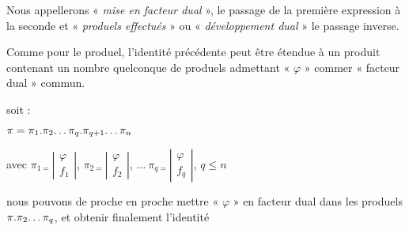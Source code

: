 Nous appellerons «  \emph{mise en facteur dual}  »{}, le passage
de la première expression à la seconde et «  \emph{produels effectués}  »{}
ou «  \emph{développement dual}  »{} le passage inverse.

Comme pour le produel, l'identité précédente peut être étendue à
un produit contenant un nombre quelconque de produels admettant «  $\varphi$  »{}
commer «  facteur dual  »{} commun.

soit :

\begin{center}
$\pi=\pi_{1}.\pi_{2}\text{\dots}\pi_{q}.\pi_{q+1}\text{\dots}\pi_{n}$
\end{center}

avec $\pi_{1=}\left|\begin{array}{c}
\varphi\\
f_{1}
\end{array}\right|$, $\pi_{2=}\left|\begin{array}{c}
\varphi\\
f_{2}
\end{array}\right|$, $\ldots\:\pi_{q=}\left|\begin{array}{c}
\varphi\\
f_{q}
\end{array}\right|$, $q\leq n$

nous pouvons de proche en proche mettre «  $\varphi$  »{} en
facteur dual dans les produels $\pi.\pi_{2}\text{\dots}\pi_{q}$,
et obtenir finalement l'identité \m

\begin{center}
\end{center}

